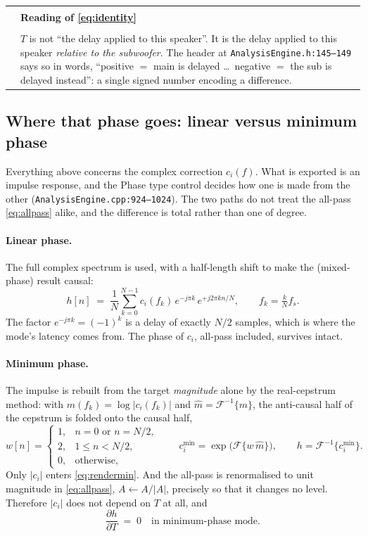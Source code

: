 \documentclass[11pt,a4paper]{article}
\makeatletter
\newcommand{\srcref}[2]{\texttt{\small #1}\discretionary{}{}{}\texttt{\small :#2}}
\newenvironment{remark}[1]
  {\par\medskip\noindent\begin{tabular}{@{}p{0.03\textwidth}p{0.93\textwidth}@{}}
   \textcolor{smtblue}{\rule{2pt}{\baselineskip}} & \textbf{#1}\\[2pt] & \ignorespaces}
  {\end{tabular}\par\medskip}
\makeatother
\begin{document}
\begin{remark}{Reading of \eqref{eq:identity}}
$T$ is not ``the delay applied to this speaker''. It is the delay applied to
this speaker \emph{relative to the subwoofer}. The header at
\srcref{AnalysisEngine.h}{145--149} says so in words, ``positive $=$ main is
delayed \dots\ negative $=$ the sub is delayed instead'': a single signed
number encoding a difference.
\end{remark}

\subsection{Where that phase goes: linear versus minimum phase}
\label{sec:phasetype}

Everything above concerns the complex correction $c_i(f)$. What is exported is an
impulse response, and the Phase type control decides how one is made from the
other (\srcref{AnalysisEngine.cpp}{924--1024}). The two paths do not treat the
all-pass \eqref{eq:allpass} alike, and the difference is total rather than one of
degree.

\paragraph{Linear phase.} The full complex spectrum is used, with a half-length
shift to make the (mixed-phase) result causal:
%
\begin{equation}
  h[n] \;=\; \frac{1}{N}\sum_{k=0}^{N-1} c_i(f_k)\, e^{-j\pi k}\, e^{+j 2\pi k n/N},
  \qquad f_k = \tfrac{k}{N} f_s .
  \label{eq:renderlin}
\end{equation}
%
The factor $e^{-j\pi k} = (-1)^k$ is a delay of exactly $N/2$ samples, which is
where the mode's latency comes from. The phase of $c_i$, all-pass included,
survives intact.

\paragraph{Minimum phase.} The impulse is rebuilt from the target
\emph{magnitude} alone by the real-cepstrum method: with
$m(f_k) = \log|c_i(f_k)|$ and $\hat m = \mathcal{F}^{-1}\{m\}$, the anti-causal
half of the cepstrum is folded onto the causal half,
%
\begin{equation}
  w[n] = \begin{cases} 1, & n = 0 \text{ or } n = N/2,\\ 2, & 1 \le n < N/2,\\ 0, & \text{otherwise,}\end{cases}
  \qquad
  c_i^{\min} = \exp\bigl(\mathcal{F}\{w\,\hat m\}\bigr),
  \qquad
  h = \mathcal{F}^{-1}\{c_i^{\min}\}.
  \label{eq:rendermin}
\end{equation}
%
Only $|c_i|$ enters \eqref{eq:rendermin}. And the all-pass is renormalised to
unit magnitude in \eqref{eq:allpass}, $A \leftarrow A/|A|$, precisely so that it
changes no level. Therefore $|c_i|$ does not depend on $T$ at all, and
%
\begin{equation}
  \boxed{\;\frac{\partial h}{\partial T} \;=\; 0 \quad\text{in minimum-phase mode.}\;}
  \label{eq:minphase-null}
\end{equation}
\end{document}
